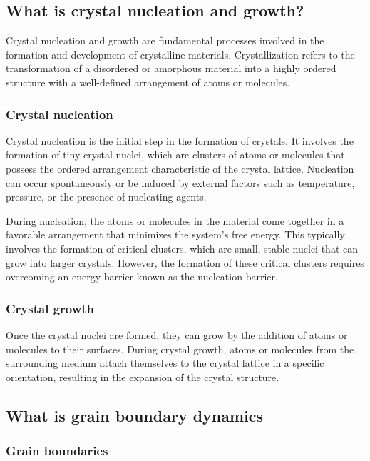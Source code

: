 \documentclass{report}
\begin{document}
\subsection{What is crystal nucleation and growth?}


Crystal nucleation and growth are fundamental processes involved in the formation and development of crystalline materials. Crystallization refers to the transformation of a disordered or amorphous material into a highly ordered structure with a well-defined arrangement of atoms or molecules.

\subsubsection{Crystal nucleation}

Crystal nucleation is the initial step in the formation of crystals. It involves the formation of tiny crystal nuclei, which are clusters of atoms or molecules that possess the ordered arrangement characteristic of the crystal lattice. Nucleation can occur spontaneously or be induced by external factors such as temperature, pressure, or the presence of nucleating agents.

During nucleation, the atoms or molecules in the material come together in a favorable arrangement that minimizes the system's free energy. This typically involves the formation of critical clusters, which are small, stable nuclei that can grow into larger crystals. However, the formation of these critical clusters requires overcoming an energy barrier known as the nucleation barrier.


\subsubsection{Crystal growth}

Once the crystal nuclei are formed, they can grow by the addition of atoms or molecules to their surfaces. During crystal growth, atoms or molecules from the surrounding medium attach themselves to the crystal lattice in a specific orientation, resulting in the expansion of the crystal structure.

\subsection{What is grain boundary dynamics}

\subsubsection{Grain boundaries}
\end{document}
